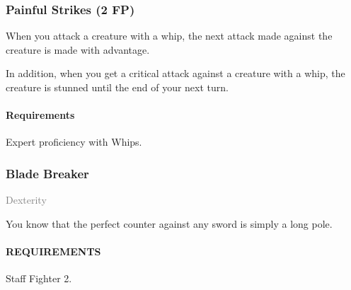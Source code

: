 \subsubsection{Painful Strikes (2 FP)} \label{feat::painfulstrikes}
    When you attack a creature with a whip, the next attack made against the creature is made with advantage.

    In addition, when you get a critical attack against a creature with a whip, the creature is stunned until the end of your next turn.
    \paragraph{Requirements} Expert proficiency with Whips.

%
\subsubsection{Blade Breaker} \label{feat::bladebreaker}
\small{\textcolor{gray}{Dexterity}}

\normalsize
You know that the perfect counter against any sword is simply a long pole.
\paragraph{REQUIREMENTS} Staff Fighter 2.

